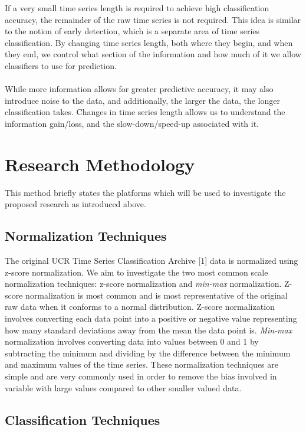 \documentclass[10pt,a4paper]{article}
\begin{document}
If a very small time series length is required to achieve high classification accuracy, the remainder of the raw time series is not required.
This idea is similar to the notion of early detection, which is a separate area of time series classification.
By changing time series length, both where they begin, and when they end, we control what section of the information and how much of it we allow classifiers to use for prediction.
\\\\
While more information allows for greater predictive accuracy, it may also introduce noise to the data, and additionally, the larger the data, the longer classification takes. 
Changes in time series length allows us to understand the information gain/loss, and the slow-down/speed-up associated with it. 


\section{Research Methodology}

This method briefly states the platforms which will be used to investigate the proposed research as introduced above.

\subsection{Normalization Techniques}

The original UCR Time Series Classification Archive [1] data is normalized using z-score normalization.
We aim to investigate the two most common scale normalization techniques: z-score normalization and \textit{min-max} normalization.
Z-score normalization is most common and is most representative of the original raw data when it conforms to a normal distribution.
Z-score normalization involves converting each data point into a positive or negative value representing how many standard deviations away from the mean the data point is.
\textit{Min-max} normalization involves converting data into values between 0 and 1 by subtracting the minimum and dividing by the difference between the minimum and maximum values of the time series.
These normalization techniques are simple and are very commonly used in order to remove the bias involved in variable with large values compared to other smaller valued data.

\subsection{Classification Techniques}
\end{document}
